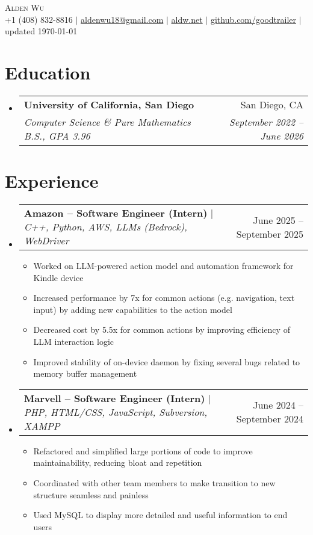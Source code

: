 \documentclass[letterpaper,11pt]{article}
\makeatletter
\newcommand{\resumeItem}[1]{
  \item\small{
    {#1 \vspace{-2pt}}
  }
}
\newcommand{\resumeSubheading}[4]{
  \vspace{-2pt}\item
    \begin{tabular*}{0.97\textwidth}[t]{l@{\extracolsep{\fill}}r}
      \textbf{#1} & #2 \\
      \textit{\small#3} & \textit{\small #4} \\
    \end{tabular*}\vspace{-7pt}
}
\newcommand{\resumeProjectHeading}[2]{
    \item
    \begin{tabular*}{0.97\textwidth}{l@{\extracolsep{\fill}}r}
      \small#1 & #2 \\
    \end{tabular*}\vspace{-7pt}
}
\newcommand{\resumeSubHeadingListStart}{\begin{itemize}[leftmargin=0.15in, label={}]}
\newcommand{\resumeSubHeadingListEnd}{\end{itemize}}
\newcommand{\resumeItemListStart}{\begin{itemize}}
\newcommand{\resumeItemListEnd}{\end{itemize}\vspace{-5pt}}
\makeatother
\begin{document}

\begin{center}
    {\huge \scshape Alden Wu} \\[0.2em]
    \small
    +1 (408) 832-8816 $\mid$
    \href{mailto:aldenwu18@gmail.com}{aldenwu18@gmail.com} $\mid$
    \href{https://aldw.net}{aldw.net} $\mid$
    \href{https://github.com/goodtrailer}{github.com/goodtrailer} $\mid$
    updated \today
\end{center}

\section{Education}
    \resumeSubHeadingListStart
        \resumeSubheading
            {University of California, San Diego}{San Diego, CA}
            {Computer Science \& Pure Mathematics B.S., GPA 3.96}{September 2022 -- June 2026}
    \resumeSubHeadingListEnd

\section{Experience}
    \resumeSubHeadingListStart
        \resumeProjectHeading
            {\textbf{Amazon -- Software Engineer (Intern)} $\mid$ \emph{C++, Python, AWS, LLMs (Bedrock), WebDriver}}{June 2025 -- September 2025}
            \resumeItemListStart
                \resumeItem{Worked on LLM-powered action model and automation framework for Kindle device}
                \resumeItem{Increased performance by 7x for common actions (e.g. navigation, text input) by adding new capabilities to the action model}
                \resumeItem{Decreased cost by 5.5x for common actions by improving efficiency of LLM interaction logic}
                \resumeItem{Improved stability of on-device daemon by fixing several bugs related to memory buffer management}
            \resumeItemListEnd
        \resumeProjectHeading
            {\textbf{Marvell -- Software Engineer (Intern)} $\mid$ \emph{PHP, HTML/CSS, JavaScript, Subversion, XAMPP}}{June 2024 -- September 2024}
            \resumeItemListStart
                \resumeItem{Refactored and simplified large portions of code to improve maintainability, reducing bloat and repetition}
                \resumeItem{Coordinated with other team members to make transition to new structure seamless and painless}
                \resumeItem{Used MySQL to display more detailed and useful information to end users}
            \resumeItemListEnd
    \resumeSubHeadingListEnd
\end{document}
